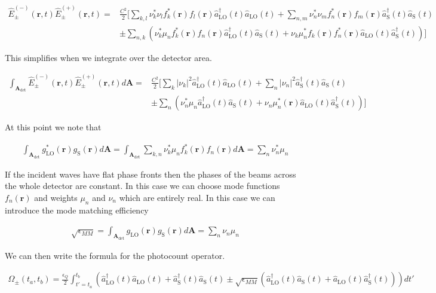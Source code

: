 \documentclass[12pt]{article}
\newcommand{\ep}{\epsilon}
\newcommand{\bv}[1]{\boldsymbol{#1}}
\begin{document}
\begin{align}
\hat{E}^{(-)}_{\pm}(\bv{r},t)\hat{E}^{(+)}_{\pm}(\bv{r},t) =& \frac{C^2}{2}\Bigg[ \sum_{k,l} \nu_k^* \nu_l f_k^*(\bv{r}) f_l(\bv{r}) \hat{a}^{\dag}_{\text{LO}}(t) \hat{a}_{\text{LO}}(t) + \sum_{n,m} \nu_n^* \nu_m f_n^*(\bv{r}) f_m(\bv{r}) \hat{a}^{\dag}_{\text{S}}(t) \hat{a}_{\text{S}}(t)\\
& \pm \sum_{n,k}\left(\nu_k^* \mu_n f_k^*(\bv{r})f_n(\bv{r}) \hat{a}^{\dag}_{\text{LO}}(t)\hat{a}_{\text{S}}(t) + \nu_k \mu_n^* f_k(\bv{r})f_n^*(\bv{r})\hat{a}_{\text{LO}}(t) \hat{a}^{\dag}_{\text{S}}(t)\right)\Bigg]
\end{align}

This simplifies when we integrate over the detector area.

\begin{align}
\int_{\bv{A}_{\text{det}}} \hat{E}^{(-)}_{\pm}(\bv{r},t)\hat{E}^{(+)}_{\pm}(\bv{r},t) d\bv{A} =& \frac{C^2}{2} \Bigg[ \sum_{k} |\nu_k|^2 \hat{a}^{\dag}_{\text{LO}}(t) \hat{a}_{\text{LO}}(t) + \sum_{n} |\nu_n|^2  \hat{a}^{\dag}_{\text{S}}(t) \hat{a}_{\text{S}}(t)\\
& \pm \sum_{n}\left(\nu_n^* \mu_n \hat{a}^{\dag}_{\text{LO}}(t)\hat{a}_{\text{S}}(t) + \nu_n \mu_n^* (\bv{r})\hat{a}_{\text{LO}}(t) \hat{a}^{\dag}_{\text{S}}(t)\right)\Bigg]
\end{align}

At this point we note that

\begin{align}
\int_{\bv{A}_{\text{det}}} g_{\text{LO}}^*(\bv{r}) g_{\text{S}}(\bv{r})d\bv{A} = \int_{\bv{A}_{\text{det}}} \sum_{k,n} \nu_k^* \mu_n f_k^*(\bv{r}) f_n(\bv{r}) d\bv{A} = \sum_{n} \nu_n^* \mu_n
\end{align}

If the incident waves have flat phase fronts then the phases of the beams across the whole detector are constant. In this case we can choose mode functions $f_n(\bv{r})$ and weights $\mu_n$ and $\nu_n$ which are entirely real. In this case we can introduce the mode matching efficiency

\begin{align}
\sqrt{\ep_{MM}} = \int_{\bv{A}_{\text{det}}} g_{\text{LO}}(\bv{r}) g_{\text{S}}(\bv{r}) d\bv{A} = \sum_n \nu_n \mu_n
\end{align}

We can then write the formula for the photocount operator.

\begin{align}
\hat{\Omega}_{\pm}(t_a,t_b) = \frac{\ep_Q}{2} \int_{t' = t_a}^{t_b} \left(\hat{a}^{\dag}_{\text{LO}}(t) \hat{a}_{\text{LO}}(t) + \hat{a}^{\dag}_{\text{S}}(t) \hat{a}_{\text{S}}(t) \pm \sqrt{\ep_{MM}} \left(\hat{a}^{\dag}_{\text{LO}}(t)\hat{a}_{\text{S}}(t) + \hat{a}_{\text{LO}}(t)\hat{a}^{\dag}_{\text{S}}(t) \right) \right) dt'
\end{align}
\end{document}

